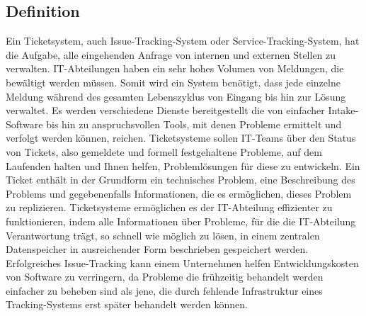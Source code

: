 \subsection{Definition}
Ein Ticketsystem, auch Issue-Tracking-System oder Service-Tracking-System, hat die Aufgabe, alle eingehenden Anfrage von internen und externen Stellen zu verwalten. IT-Abteilungen haben ein sehr hohes Volumen von Meldungen, die bewältigt werden müssen. Somit wird ein System benötigt, dass jede einzelne Meldung während des gesamten Lebenszyklus von Eingang bis hin zur Lösung verwaltet.
Es werden verschiedene Dienste bereitgestellt die von einfacher Intake-Software bis hin zu anspruchsvollen Tools, mit denen Probleme ermittelt und verfolgt werden können, reichen.
Ticketsysteme sollen IT-Teams über den Status von Tickets, also gemeldete und formell festgehaltene Probleme, auf dem Laufenden halten und Ihnen helfen, Problemlösungen für diese zu entwickeln. 
Ein Ticket enthält in der Grundform ein technisches Problem, eine Beschreibung des Problems und gegebenenfalls Informationen, die es ermöglichen, dieses Problem zu replizieren.
Ticketsysteme ermöglichen es der IT-Abteilung effizienter zu funktionieren, indem alle Informationen über Probleme, für die die IT-Abteilung Verantwortung trägt, so schnell wie möglich zu lösen, in einem zentralen Datenspeicher in ausreichender Form beschrieben gespeichert werden.
Erfolgreiches Issue-Tracking kann einem Unternehmen helfen Entwicklungskosten von Software zu verringern, da Probleme die frühzeitig behandelt werden einfacher zu beheben sind als jene, die durch fehlende Infrastruktur eines Tracking-Systems erst später behandelt werden können.
